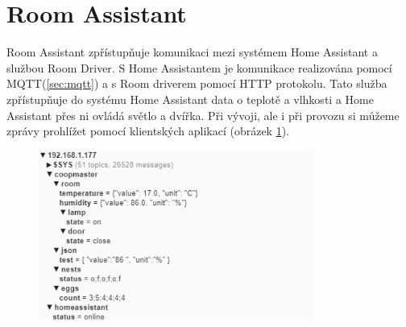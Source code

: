 \section{Room Assistant}\label{sec:room-assistant}

Room Assistant zpřístupňuje komunikaci mezi systémem Home Assistant a službou Room Driver.\newline
S Home Assistantem je komunikace realizována pomocí MQTT(\ref{sec:mqtt}) a s Room driverem pomocí HTTP protokolu.
Tato služba zpřístupňuje do systému Home Assistant data o teplotě a vlhkosti a Home Assistant přes ni ovládá světlo a dvířka.
Při vývoji, ale i při provozu si můžeme zprávy prohlížet pomocí klientských aplikací (obrázek \ref{fig:homeassistant_input_data_mqtt}).

\begin{figure}[H]
    \centering
    \includegraphics[width=0.8\textwidth]{img/homeassistant_input_data_mqtt}
    \label{fig:homeassistant_input_data_mqtt}
\end{figure}


